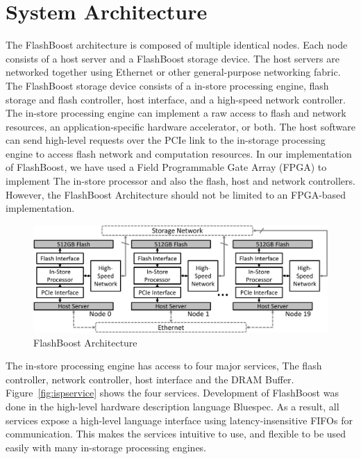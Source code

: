 \section{System Architecture}

The FlashBoost architecture is composed of multiple identical nodes. Each node
consists of a host server and a FlashBoost storage device. The host servers are
networked together using Ethernet or other general-purpose networking fabric.
The FlashBoost storage device consists of a in-store processing engine, flash
storage and flash controller, host interface, and a high-speed network controller.
The in-store processing engine can implement a raw
access to flash and network resources, an application-specific hardware
accelerator, or both. The host software can send high-level requests over the
PCIe link to the in-storage processing engine to access flash network and computation resources.
In our implementation of FlashBoost, we have used a Field Programmable Gate
Array (FPGA) to implement The in-store processor and also the flash, host and
network controllers. However, the FlashBoost Architecture should not be limited
to an FPGA-based implementation.


\begin{figure}[ht]
	\begin{center}
	\includegraphics[width=0.8\paperwidth]{figures/architecture.pdf}
	\caption{FlashBoost Architecture}
	\label{fig:architecture}
	\end{center}
\end{figure}


The in-store processing engine has access to four major services, The flash
controller, network controller, host interface and the DRAM Buffer.
Figure~\ref{fig:ispservice} shows the four services. Development of FlashBoost was
done in the high-level hardware description language Bluespec. As a result, all
services expose a high-level language interface using latency-insensitive FIFOs
for communication. This makes the services intuitive to use, and flexible to be
used easily with many in-storage processing engines.

